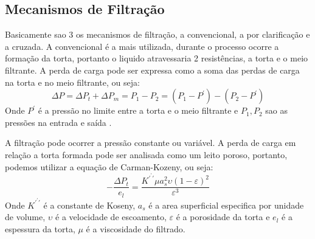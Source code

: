 \subsection{Mecanismos de Filtração}
Basicamente sao 3 os mecanismos de filtração, a convencional, a por clarificação e a cruzada. A
convencional é a mais utilizada, durante o processo ocorre a formação da torta, portanto o liquido
atravessaria 2 resistências, a torta e o meio filtrante. A perda de carga pode ser expressa como a
soma das perdas de carga na torta e no meio filtrante, ou seja:
\begin{equation}
    \Delta P = \Delta P_{t} + \Delta P_{m} = P_1 - P_2 = (P_1 - P^{\prime} ) - (P_2 - P^{\prime} )
\end{equation}
Onde \(P^{\prime}\) é a pressão no limite entre a torta e o meio filtrante e \(P_1, P_2\) sao as
pressões na entrada e saída . \par
A filtração pode ocorrer a pressão constante ou variável. A perda de carga em relação a torta
formada pode ser analisada como um leito poroso, portanto, podemos utilizar a equação de
Carman-Kozeny, ou seja:
\begin{equation}
    -\frac{\Delta P_{t} }{e_{l} } = \frac{K^{\prime^{\prime}  \prime } \mu a_{s} ^{2} \upsilon (1-\varepsilon )^{2} }{\varepsilon ^{3} }
\end{equation}
Onde \(K^{\prime^{\prime}  \prime }\) é a constante de Koseny, \(a_{s}\) é a area superficial
especifica por unidade de volume, \(\upsilon\) é a velocidade de escoamento, \(\varepsilon\) é a
porosidade da torta e \(e_{l}\) é a espessura da torta, \(\mu \) é a viscosidade do filtrado. \par

